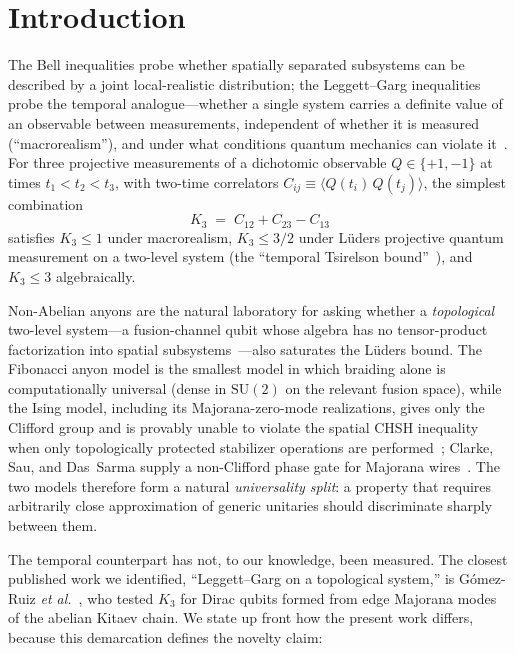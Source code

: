 \documentclass[aps,prx,reprint,amsmath,amssymb,floatfix,nofootinbib,superscriptaddress]{revtex4-2}
\begin{document}
\maketitle

\section{Introduction}

The Bell inequalities probe whether spatially separated subsystems can
be described by a joint local-realistic distribution; the
Leggett--Garg inequalities~\cite{LeggettGarg1985} probe the temporal
analogue---whether a single system carries a definite value of an
observable between measurements, independent of whether it is measured
(``macrorealism''), and under what conditions quantum mechanics can
violate it~\cite{KoflerBrukner2008}. For three projective measurements of a dichotomic
observable $Q \in \{+1,-1\}$ at times $t_{1} < t_{2} < t_{3}$, with
two-time correlators $C_{ij} \equiv \langle Q(t_{i})\,Q(t_{j}) \rangle$,
the simplest combination
\begin{equation}
  K_{3} \;=\; C_{12} + C_{23} - C_{13}
\end{equation}
satisfies $K_{3} \leq 1$ under macrorealism, $K_{3} \leq 3/2$ under
L\"uders projective quantum measurement on a two-level system (the
``temporal Tsirelson bound''~\cite{Budroni2014}), and $K_{3} \leq 3$
algebraically.

Non-Abelian anyons are the natural laboratory for asking whether a
\emph{topological} two-level system---a fusion-channel qubit whose
algebra has no tensor-product factorization into spatial
subsystems~\cite{NayakSimonStern2008}---also saturates the L\"uders
bound. The Fibonacci anyon model is the smallest model in which
braiding alone is computationally universal (dense in $\mathrm{SU}(2)$
on the relevant fusion space), while the Ising model, including its
Majorana-zero-mode realizations, gives only the Clifford group and is
provably unable to violate the spatial CHSH inequality when only
topologically protected stabilizer operations are
performed~\cite{HowardVala2012}; Clarke, Sau, and
Das~Sarma supply a non-Clifford phase gate for Majorana
wires~\cite{ClarkeSauDasSarma2016}. The two models
therefore form a natural \emph{universality split}: a property that
requires arbitrarily close approximation of generic unitaries should
discriminate sharply between them.

The temporal counterpart has not, to our knowledge, been measured. The closest published work we identified, ``Leggett--Garg on a topological system,'' is G\'omez-Ruiz
\emph{et al.}~\cite{GomezRuiz2018}, who tested $K_{3}$ for Dirac
qubits formed from edge Majorana modes of the abelian Kitaev chain.
We state up front how the present work differs, because this
demarcation defines the novelty claim:
\end{document}
